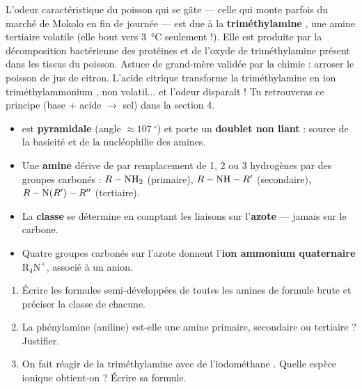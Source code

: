 \documentclass[11pt]{article}
\providecommand{\degree}{^{\circ}}
\begin{document}
\begin{savaistu}
L'odeur caractéristique du poisson qui se gâte — celle qui monte parfois du marché de Mokolo en fin de journée — est due à la \textbf{triméthylamine} , une amine tertiaire volatile (elle bout vers \SI{3}{\celsius} seulement !). Elle est produite par la décomposition bactérienne des protéines et de l'oxyde de triméthylamine présent dans les tissus du poisson. Astuce de grand-mère validée par la chimie : arroser le poisson de jus de citron. L'acide citrique transforme la triméthylamine en ion triméthylammonium , non volatil... et l'odeur disparaît ! Tu retrouveras ce principe (base + acide $\rightarrow$ sel) dans la section 4.
\end{savaistu}

\begin{aretenir}
\begin{itemize}
  \item {} est \textbf{pyramidale} (angle $\approx \SI{107}{\degree}$) et porte un \textbf{doublet non liant} : source de la basicité et de la nucléophilie des amines.
  \item Une \textbf{amine} dérive de  par remplacement de 1, 2 ou 3 hydrogènes par des groupes carbonés : $R-\ce{NH2}$ (primaire), $R-\ce{NH}-R'$ (secondaire), $R-\ce{N}(R')-R''$ (tertiaire).
  \item La \textbf{classe} se détermine en comptant les liaisons  sur l'\textbf{azote} — jamais sur le carbone.
  \item Quatre groupes carbonés sur l'azote donnent l'\textbf{ion ammonium quaternaire} $\mathrm{R_4N^+}$, associé à un anion.
\end{itemize}
\end{aretenir}

\begin{exercice}
\begin{enumerate}
  \item Écrire les formules semi-développées de toutes les amines de formule brute  et préciser la classe de chacune.
  \item La phénylamine (aniline)  est-elle une amine primaire, secondaire ou tertiaire ? Justifier.
  \item On fait réagir de la triméthylamine avec de l'iodométhane . Quelle espèce ionique obtient-on ? Écrire sa formule.
\end{enumerate}
\end{exercice}
\end{document}
